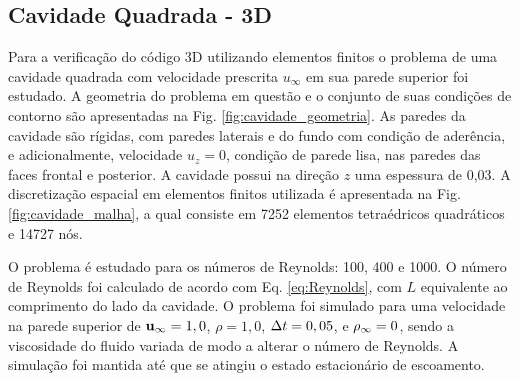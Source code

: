 \documentclass[tese_patricia]{subfiles}%
\begin{document}
\subsection{Cavidade Quadrada - 3D}

Para a verificação do código 3D utilizando elementos finitos o problema de uma cavidade quadrada com velocidade prescrita $u_{\infty}$ em sua parede superior foi estudado. A geometria do problema em questão e o conjunto de suas condições de contorno são apresentadas na Fig. \ref{fig:cavidade_geometria}. As paredes da cavidade são rígidas, com paredes laterais e do fundo com condição de aderência, e adicionalmente, velocidade $u_{z}=0$, condição de parede lisa, nas paredes das faces frontal e posterior. A cavidade possui na direção $z$ uma espessura de 0,03. A discretização espacial em elementos finitos utilizada é apresentada na Fig.  \ref{fig:cavidade_malha}, a qual consiste em 7252 elementos tetraédricos quadráticos e 14727 nós.

O problema é estudado para os números de Reynolds: 100, 400 e 1000. O número de Reynolds foi calculado de acordo com Eq. \eqref{eq:Reynolds}, com $L$ equivalente ao comprimento do lado da cavidade. O problema foi simulado para uma velocidade na parede superior de $\mathbf{u}_{\infty} = 1,0$, $\rho = 1,0$, $\Delta t = 0,05$, e $\rho_\infty = 0$, sendo a viscosidade do fluido variada de modo a alterar o número de Reynolds. A simulação foi mantida até que se atingiu o estado estacionário de escoamento. 
\end{document}
